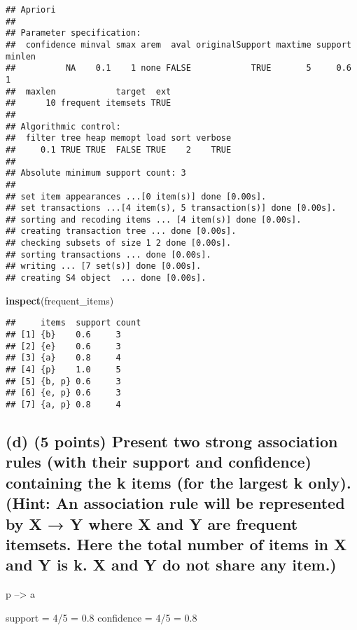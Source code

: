 \documentclass[
]{article}
\newenvironment{Shaded}{\begin{snugshade}}{\end{snugshade}}
\newcommand{\FunctionTok}[1]{\textcolor[rgb]{0.13,0.29,0.53}{\textbf{#1}}}
\newcommand{\NormalTok}[1]{#1}
\begin{document}
\begin{verbatim}
## Apriori
## 
## Parameter specification:
##  confidence minval smax arem  aval originalSupport maxtime support minlen
##          NA    0.1    1 none FALSE            TRUE       5     0.6      1
##  maxlen            target  ext
##      10 frequent itemsets TRUE
## 
## Algorithmic control:
##  filter tree heap memopt load sort verbose
##     0.1 TRUE TRUE  FALSE TRUE    2    TRUE
## 
## Absolute minimum support count: 3 
## 
## set item appearances ...[0 item(s)] done [0.00s].
## set transactions ...[4 item(s), 5 transaction(s)] done [0.00s].
## sorting and recoding items ... [4 item(s)] done [0.00s].
## creating transaction tree ... done [0.00s].
## checking subsets of size 1 2 done [0.00s].
## sorting transactions ... done [0.00s].
## writing ... [7 set(s)] done [0.00s].
## creating S4 object  ... done [0.00s].
\end{verbatim}

\begin{Shaded}
\begin{Highlighting}[]
\FunctionTok{inspect}\NormalTok{(frequent\_items)}
\end{Highlighting}
\end{Shaded}

\begin{verbatim}
##     items  support count
## [1] {b}    0.6     3    
## [2] {e}    0.6     3    
## [3] {a}    0.8     4    
## [4] {p}    1.0     5    
## [5] {b, p} 0.6     3    
## [6] {e, p} 0.6     3    
## [7] {a, p} 0.8     4
\end{verbatim}

\subsection{(d) (5 points) Present two strong association rules (with
their support and confidence) containing the k items (for the largest k
only). (Hint: An association rule will be represented by X → Y where X
and Y are frequent itemsets. Here the total number of items in X and Y
is k. X and Y do not share any
item.)}\label{d-5-points-present-two-strong-association-rules-with-their-support-and-confidence-containing-the-k-items-for-the-largest-k-only.-hint-an-association-rule-will-be-represented-by-x-y-where-x-and-y-are-frequent-itemsets.-here-the-total-number-of-items-in-x-and-y-is-k.-x-and-y-do-not-share-any-item.}

p --\textgreater{} a

support = 4/5 = 0.8 confidence = 4/5 = 0.8
\end{document}
